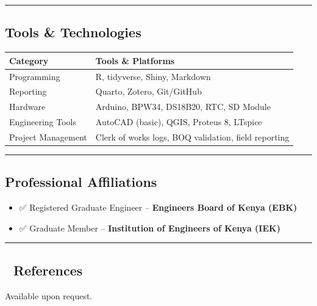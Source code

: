 \documentclass[
  11pt,
]{article}
\providecommand{\tightlist}{%
  \setlength{\itemsep}{0pt}\setlength{\parskip}{0pt}}
\begin{document}
\begin{center}\rule{0.5\linewidth}{0.5pt}\end{center}

\subsection{Tools \& Technologies}\label{tools-technologies}

\begin{longtable}[]{@{}
  >{\raggedright\arraybackslash}p{}
  >{\raggedright\arraybackslash}p{}@{}}
\toprule\noalign{}
\begin{minipage}[b]{\linewidth}\raggedright
Category
\end{minipage} & \begin{minipage}[b]{\linewidth}\raggedright
Tools \& Platforms
\end{minipage} \\
\midrule\noalign{}
\endhead
\bottomrule\noalign{}
\endlastfoot
Programming & R, tidyverse, Shiny, Markdown \\
Reporting & Quarto, Zotero, Git/GitHub \\
Hardware & Arduino, BPW34, DS18B20, RTC, SD Module \\
Engineering Tools & AutoCAD (basic), QGIS, Proteus 8, LTspice \\
Project Management & Clerk of works logs, BOQ validation, field
reporting \\
\end{longtable}

\begin{center}\rule{0.5\linewidth}{0.5pt}\end{center}

\subsection{Professional Affiliations}\label{professional-affiliations}

\begin{itemize}
\tightlist
\item
  ✅ Registered Graduate Engineer -- \textbf{Engineers Board of Kenya
  (EBK)}\\
\item
  ✅ Graduate Member -- \textbf{Institution of Engineers of Kenya (IEK)}
\end{itemize}

\begin{center}\rule{0.5\linewidth}{0.5pt}\end{center}

\subsection{📁 References}\label{references}

Available upon request.
\end{document}
